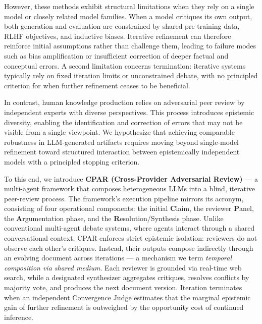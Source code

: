 \documentclass[11pt, a4paper]{article}
\begin{document}
However, these methods exhibit structural limitations when they rely on a single model or closely related model families. When a model critiques its own output, both generation and evaluation are constrained by shared pre-training data, RLHF objectives, and inductive biases. Iterative refinement can therefore reinforce initial assumptions rather than challenge them, leading to failure modes such as bias amplification or insufficient correction of deeper factual and conceptual errors. A second limitation concerns termination: iterative systems typically rely on fixed iteration limits or unconstrained debate, with no principled criterion for when further refinement ceases to be beneficial.

In contrast, human knowledge production relies on adversarial peer review by independent experts with diverse perspectives. This process introduces epistemic diversity, enabling the identification and correction of errors that may not be visible from a single viewpoint. We hypothesize that achieving comparable robustness in LLM-generated artifacts requires moving beyond single-model refinement toward structured interaction between epistemically independent models with a principled stopping criterion.

To this end, we introduce \textbf{CPAR (Cross-Provider Adversarial Review)} --- a multi-agent framework that composes heterogeneous LLMs into a blind, iterative peer-review process. The framework's execution pipeline mirrors its acronym, consisting of four operational components: the initial \textbf{C}laim, the reviewer \textbf{P}anel, the \textbf{A}rgumentation phase, and the \textbf{R}esolution/Synthesis phase. Unlike conventional multi-agent debate systems, where agents interact through a shared conversational context, CPAR enforces strict epistemic isolation: reviewers do not observe each other's critiques. Instead, their outputs compose indirectly through an evolving document across iterations --- a mechanism we term \textit{temporal composition via shared medium}. Each reviewer is grounded via real-time web search, while a designated synthesizer aggregates critiques, resolves conflicts by majority vote, and produces the next document version. Iteration terminates when an independent Convergence Judge estimates that the marginal epistemic gain of further refinement is outweighed by the opportunity cost of continued inference.
\end{document}
